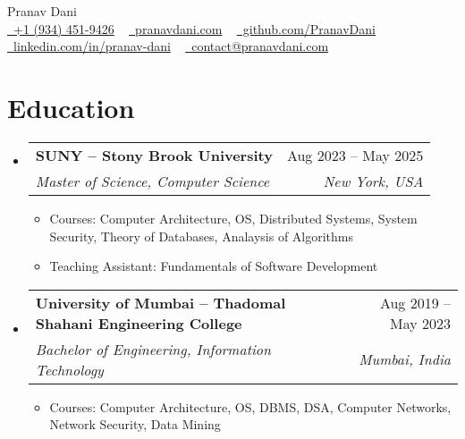 \documentclass[letterpaper,11pt]{article}
\makeatletter
\newcommand{\resumeItem}[1]{
  \item\small{
    {#1 \vspace{-2pt}}
  }
}
\newcommand{\resumeSubheading}[4]{
  \vspace{-2pt}\item
    \begin{tabular*}{1.0\textwidth}[t]{l@{\extracolsep{\fill}}r}
      \vspace{-2pt}\textbf{#1} & \small #2 \\
      \textit{\small#3} & \textit{\small #4} \\
    \end{tabular*}\vspace{-7pt}
}
\newcommand{\resumeSubHeadingListStart}{\begin{itemize}[leftmargin=0.0in, label={}]}
\newcommand{\resumeSubHeadingListEnd}{\end{itemize}}
\newcommand{\resumeItemListStart}{\begin{itemize}}
\newcommand{\resumeItemListEnd}{\end{itemize}\vspace{-5pt}}
\makeatother
\begin{document}

\begin{center}
  {\huge Pranav Dani} \\ \vspace{4pt}
  \small
  \faMobile
  \href{tel:+19344529426}{\raisebox{-0.2\height}\ +1 (934) 451-9426} ~
  \faGlobe \href{https://pranavdani.com}{\raisebox{-0.1\height}\ pranavdani.com} ~
  \faGithub \href{https://github.com/PranavDani}{\raisebox{-0.2\height}\  github.com/PranavDani} ~
  \faLinkedin \href{https://linkedin.com/in/pranav-dani}{\raisebox{-0.2\height}\  linkedin.com/in/pranav-dani} ~
  \faEnvelope \href{mailto:contact@pranavdani.com}{\raisebox{-0.2\height}\    contact@pranavdani.com}
  \vspace{-10pt}
\end{center}


\section{Education}
\resumeSubHeadingListStart
\resumeSubheading
{SUNY -- Stony Brook University}{Aug 2023 -- May 2025}
{Master of Science, Computer Science }{New York, USA}
\resumeItemListStart
\resumeItem{Courses: Computer Architecture, OS, Distributed Systems, System Security, Theory of Databases, Analaysis of Algorithms}
\vspace{-2pt}
\resumeItem{Teaching Assistant: Fundamentals of Software Development}
\resumeItemListEnd
\vspace{-3pt}

\resumeSubheading
{University of Mumbai -- Thadomal Shahani Engineering College}{Aug 2019 -- May 2023}
{Bachelor of Engineering, Information Technology}{Mumbai, India}
\resumeItemListStart
\resumeItem{Courses: Computer Architecture, OS, DBMS, DSA, Computer Networks, Network Security, Data Mining}
\resumeItemListEnd
\resumeSubHeadingListEnd
\vspace{-18pt}


\end{document}
